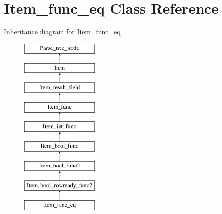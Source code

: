 \hypertarget{classItem__func__eq}{}\section{Item\+\_\+func\+\_\+eq Class Reference}
\label{classItem__func__eq}
Inheritance diagram for Item\+\_\+func\+\_\+eq\+:\begin{figure}[H]
\begin{center}
\leavevmode
\includegraphics[height=9.000000cm]{classItem__func__eq}
\end{center}
\end{figure}
